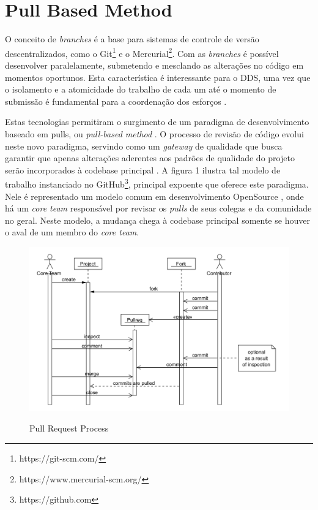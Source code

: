 \documentclass[a4paper,12pt]{monografia}
\theoremstyle{plain}
\theoremstyle{definition}
\theoremstyle{remark}
\begin{document}
\section{Pull Based Method}\label{sec:pull_based}
  O conceito de \textit{branches} é a base para sistemas de controle de versão descentralizados, como o  Git\footnote{https://git-scm.com/} e o Mercurial\footnote{https://www.mercurial-scm.org/}. Com as \textit{branches} é possível desenvolver paralelamente, submetendo e mesclando as alterações no código em momentos oportunos. Esta característica é interessante para o DDS, uma vez que o isolamento e a atomicidade do trabalho de cada um até o momento de submissão é fundamental para a coordenação dos esforços \cite{barr2012}.

  Estas tecnologias permitiram o surgimento de um paradigma de desenvolvimento baseado em pulls, ou \textit{pull-based method} \cite{gousios2014}. O processo de revisão de código evolui neste novo paradigma, servindo como um \textit{gateway} de qualidade que busca garantir que apenas alterações aderentes aos padrões de qualidade do projeto serão incorporados à codebase principal \cite{gousios2015}. A figura 1 ilustra tal modelo de trabalho instanciado no GitHub\footnote{https://github.com}, principal expoente que oferece este paradigma. Nele é representado um modelo comum em desenvolvimento OpenSource \cite{6385140}, onde há um \textit{core team} responsável por revisar os \textit{pulls} de seus colegas e da comunidade no geral. Neste modelo, a mudança chega à codebase principal somente se houver o aval de um membro do \textit{core team}.

   \begin{figure}[!htbp]
    \includegraphics[width=\textwidth]{pull-request-flow}\label{fig:pull-request-flow}
    \caption{Pull Request Process \cite{gousios2014}}
  \end{figure}
\end{document}
